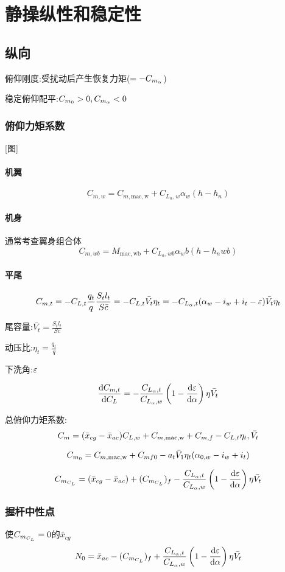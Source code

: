 \chapter{静操纵性和稳定性}

\section{纵向}
俯仰刚度:受扰动后产生恢复力矩($=-{C_{m_\alpha}}$)

稳定俯仰配平:${C_{m_0}} >0 ,{C_{m_\alpha}}<0$

\subsection{俯仰力矩系数}
[图]
\subsubsection{机翼}
$$C_{m,w}=C_{m,\mathrm{mac,w}}+C_{L_\alpha,w} \alpha_w(h-h_n)$$

\subsubsection{机身}
通常考查翼身组合体
$$C_{m,wb}=M_{\mathrm{mac,wb}}+C_{L_\alpha,wb} \alpha_wb(h-h_nwb)$$

\subsubsection{平尾}
$$C_{m,t}=-C_{L,t}\frac{q_t}{q}\frac{S_tl_t}{S\bar{c}}=-C_{L,t}\bar{V_t}\eta_t=-C_{L_{\alpha},t}(\alpha_w-i_w+i_t-{\varepsilon})\bar{V_t}\eta_t$$

尾容量:$\displaystyle\bar{V_t}=\frac{S_tl_t}{S\bar{c}}$

动压比:$\displaystyle\eta_t=\frac{q_t}{q}$

下洗角:${\varepsilon}$

$$\frac{\operatorname{d\!} C_{m,t}}{\operatorname{d\!} {C_L}}=-\frac{C_{L_\alpha,t}}{C_{L_\alpha,w}}\left(1-\frac{\operatorname{d\!} {\varepsilon}}{\operatorname{d\!} \alpha}\right)\eta\bar{V_t}$$

\nl
总俯仰力矩系数:
$${C_m}=(\bar{x}_{cg}-\bar{x}_{ac})C_{L,w}+C_{m,\mathrm{mac,w}}+C_{m,f}-C_{L,t}\eta_t,\bar{V_t}$$

$${C_{m_0}}=C_{m,\mathrm{mac,w}}+C_{mf0}-a_t\bar{V}_1\eta_t(\alpha_{0,w}-i_w+i_t)$$

$${C_{m_{C_L}}}=(\bar{x}_{cg}-\bar{x}_{ac})+({C_{m_{C_L}}})_f-\frac{C_{L_\alpha,t}}{C_{L_\alpha,w}}\left(1-\frac{\operatorname{d\!} {\varepsilon}}{\operatorname{d\!} \alpha}\right)\eta\bar{V_t}$$

\subsection{握杆中性点}
使${C_{m_{C_L}}}=0$的$\bar{x}_{cg}$
$$N_0=\bar{x}_{ac}-({C_{m_{C_L}}})_f+\frac{C_{L_\alpha,t}}{C_{L_\alpha,w}}\left(1-\frac{\operatorname{d\!} {\varepsilon}}{\operatorname{d\!} \alpha}\right)\eta\bar{V_t}$$

